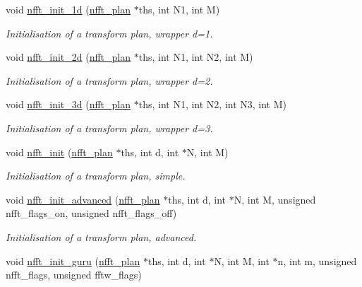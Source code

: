 \begin{CompactItemize}
\item 
void \hyperlink{group__nfft_g01dbd2cfc9cc8577fc097e607e3c845f}{nfft\_\-init\_\-1d} (\hyperlink{structnfft__plan}{nfft\_\-plan} $\ast$ths, int N1, int M)
\begin{CompactList}\small\item\em Initialisation of a transform plan, wrapper d=1. \item\end{CompactList}\item 
void \hyperlink{group__nfft_g54ab08124f47fe412b2979abdc28cc16}{nfft\_\-init\_\-2d} (\hyperlink{structnfft__plan}{nfft\_\-plan} $\ast$ths, int N1, int N2, int M)
\begin{CompactList}\small\item\em Initialisation of a transform plan, wrapper d=2. \item\end{CompactList}\item 
void \hyperlink{group__nfft_g67493342a23bdbb4301063f96e13fd88}{nfft\_\-init\_\-3d} (\hyperlink{structnfft__plan}{nfft\_\-plan} $\ast$ths, int N1, int N2, int N3, int M)
\begin{CompactList}\small\item\em Initialisation of a transform plan, wrapper d=3. \item\end{CompactList}\item 
void \hyperlink{group__nfft_g1dfeaf18f3735f035afa62ca768d99c4}{nfft\_\-init} (\hyperlink{structnfft__plan}{nfft\_\-plan} $\ast$ths, int d, int $\ast$N, int M)
\begin{CompactList}\small\item\em Initialisation of a transform plan, simple. \item\end{CompactList}\item 
void \hyperlink{group__nfft_gcd4a22fd1f6ea476a57759a90510d114}{nfft\_\-init\_\-advanced} (\hyperlink{structnfft__plan}{nfft\_\-plan} $\ast$ths, int d, int $\ast$N, int M, unsigned nfft\_\-flags\_\-on, unsigned nfft\_\-flags\_\-off)
\begin{CompactList}\small\item\em Initialisation of a transform plan, advanced. \item\end{CompactList}\item 
void \hyperlink{group__nfft_g406f05717c6299b918261c61aaa9de23}{nfft\_\-init\_\-guru} (\hyperlink{structnfft__plan}{nfft\_\-plan} $\ast$ths, int d, int $\ast$N, int M, int $\ast$n, int m, unsigned nfft\_\-flags, unsigned fftw\_\-flags)

\end{CompactItemize}
